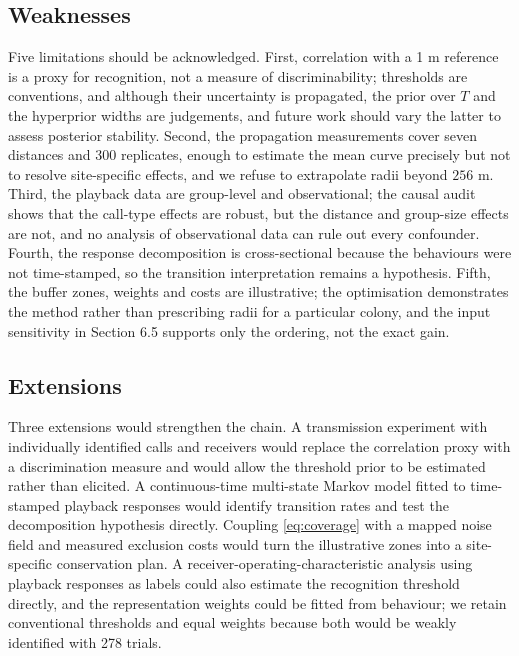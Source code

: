 \documentclass{apmcmthesis}
\begin{document}
\subsection{Weaknesses}

Five limitations should be acknowledged. First, correlation with a 1 m reference is a proxy for recognition, not a measure of discriminability; thresholds are conventions, and although their uncertainty is propagated, the prior over $T$ and the hyperprior widths are judgements, and future work should vary the latter to assess posterior stability. Second, the propagation measurements cover seven distances and 300 replicates, enough to estimate the mean curve precisely but not to resolve site-specific effects, and we refuse to extrapolate radii beyond $256$ m. Third, the playback data are group-level and observational; the causal audit shows that the call-type effects are robust, but the distance and group-size effects are not, and no analysis of observational data can rule out every confounder. Fourth, the response decomposition is cross-sectional because the behaviours were not time-stamped, so the transition interpretation remains a hypothesis. Fifth, the buffer zones, weights and costs are illustrative; the optimisation demonstrates the method rather than prescribing radii for a particular colony, and the input sensitivity in Section 6.5 supports only the ordering, not the exact gain.

\subsection{Extensions}

Three extensions would strengthen the chain. A transmission experiment with individually identified calls and receivers would replace the correlation proxy with a discrimination measure and would allow the threshold prior to be estimated rather than elicited. A continuous-time multi-state Markov model fitted to time-stamped playback responses would identify transition rates and test the decomposition hypothesis directly. Coupling \eqref{eq:coverage} with a mapped noise field and measured exclusion costs would turn the illustrative zones into a site-specific conservation plan. A receiver-operating-characteristic analysis using playback responses as labels could also estimate the recognition threshold directly, and the representation weights could be fitted from behaviour; we retain conventional thresholds and equal weights because both would be weakly identified with 278 trials.
\end{document}
